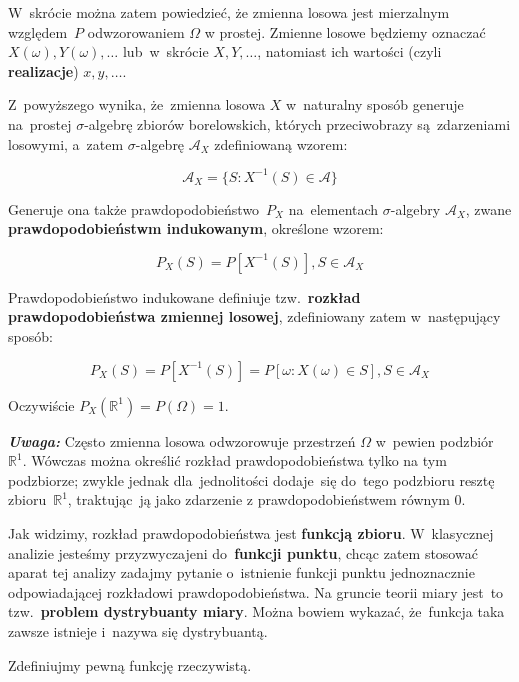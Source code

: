 \documentclass[10pt,a4paper]{article}
\newcommand{\Warning}{\marginpar{\dbend}\textbf{\textit{Uwaga: }}}
\begin{document}
W~skrócie można zatem powiedzieć, że zmienna losowa jest mierzalnym względem~$P$
odwzorowaniem $\Omega$ w prostej. Zmienne losowe będziemy oznaczać $X(\omega),
Y(\omega),\dotsc$ lub~w~skrócie $X, Y,\dotsc$, natomiast ich wartości (czyli
\textbf{realizacje}) $x, y,\dotsc$.

Z~powyższego wynika, że~zmienna losowa $X$ w~naturalny sposób generuje na~prostej
$\sigma$-algebrę zbiorów borelowskich, których przeciwobrazy są~zdarzeniami
losowymi, a~zatem $\sigma$-algebrę $\mathscr{A}_X$ zdefiniowaną wzorem:

\begin{equation}
  \mathscr{A}_X = \{S: X^{-1}(S)\in\mathscr{A}\}
\end{equation}

Generuje ona także prawdopodobieństwo~$P_X$ na~elementach $\sigma$-algebry
$\mathscr{A}_X$, zwane \textbf{prawdopodobieństwm indukowanym}, określone wzorem:

\begin{equation}
  P_X(S) = P[X^{-1}(S)], S\in\mathscr{A}_X
\end{equation}

Prawdopodobieństwo indukowane definiuje tzw.~\textbf{rozkład prawdopodobieństwa
  zmiennej losowej}, zdefiniowany zatem w~następujący sposób:

\begin{equation}
  P_X(S) = P[X^{-1}(S)] = P[\omega: X(\omega)\in S], S\in\mathscr{A}_X
\end{equation}

Oczywiście $P_X(\mathbb{R}^1) = P(\Omega) = 1$.

\Warning Często zmienna losowa odwzorowuje przestrzeń $\Omega$ w~pewien
podzbiór~$\mathbb{R}^1$. Wówczas można określić rozkład prawdopodobieństwa tylko na tym
podzbiorze; zwykle jednak dla~jednolitości dodaje~się do~tego podzbioru resztę
zbioru~$\mathbb{R}^1$, traktując~ją jako zdarzenie z prawdopodobieństwem równym $0$.

Jak widzimy, rozkład prawdopodobieństwa jest \textbf{funkcją zbioru}. W~klasycznej
analizie jesteśmy przyzwyczajeni do~\textbf{funkcji punktu}, chcąc zatem stosować
aparat tej analizy zadajmy pytanie o~istnienie funkcji punktu jednoznacznie
odpowiadającej rozkładowi prawdopodobieństwa. Na gruncie teorii miary jest~to
tzw.~\textbf{problem dystrybuanty miary}. Można bowiem wykazać, że~funkcja taka
zawsze istnieje i~nazywa się dystrybuantą.

Zdefiniujmy pewną funkcję rzeczywistą.
\end{document}
